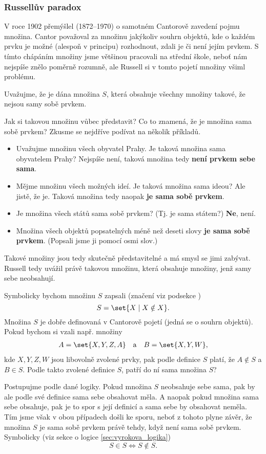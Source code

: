 \subsubsection{Russellův paradox}
V roce 1902 přemýšlel  (1872--1970) o samotném Cantorově zavedení pojmu množina. Cantor považoval za množinu jakýkoliv souhrn objektů, kde o každém prvku je možné (alespoň v principu) rozhodnout, zdali je či není jejím prvkem. S tímto chápáním množiny jsme většinou pracovali na střední škole, neboť nám nejspíše znělo poměrně rozumně, ale Russell si v tomto pojetí množiny všiml problému.\par
Uvažujme, že je dána množina $S$, která obsahuje všechny množiny takové, že nejsou samy sobě prvkem.\par
Jak si takovou množinu vůbec představit? Co to znamená, že je množina sama sobě prvkem? Zkusme se nejdříve podívat na několik příkladů.
\begin{itemize}
    \item Uvažujme množinu všech obyvatel Prahy. Je taková množina sama obyvatelem Prahy? Nejspíše není, taková množina tedy \textbf{není prvkem sebe sama}.
    \item Mějme množinu všech možných ideí. Je taková množina sama ideou? Ale jistě, že je. Taková množina tedy naopak \textbf{je sama sobě prvkem}.
    \item Je množina všech států sama sobě prvkem? (Tj. je sama státem?) \textbf{Ne}, není.
    \item Množina všech objektů popsatelných méně než deseti slovy \textbf{je sama sobě prvkem}. (Popsali jsme ji pomocí osmi slov.)
\end{itemize}
Takové množiny jsou tedy skutečně představitelné a má smysl se jimi zabývat. Russell tedy uvážil právě takovou množinu, která obsahuje množiny, jenž samy sebe neobsahují.

Symbolicky bychom množinu $S$ zapsali (značení viz podsekce )
\begin{equation*}
S=\set{X \mid X \notin X}.
\end{equation*}
Množina $S$ je dobře definovaná v Cantorově pojetí (jedná se o souhrn objektů). Pokud bychom si vzali např. množiny
\begin{align*}
A=\set{X,Y,Z,A} \quad \text{a} \quad B=\set{X,Y,W},
\end{align*}
kde $X,Y,Z,W$ jsou libovolně zvolené prvky, pak podle definice $S$ platí, že $A \notin S$ a $B \in S$. Podle takto zvolené definice $S$, patří do ní sama množina $S$?\par
Postupujme podle dané logiky. Pokud množina $S$ neobsahuje sebe sama, pak by ale podle své definice sama sebe obsahovat měla. A naopak pokud množina sama sebe obsahuje, pak je to spor s její definicí a sama sebe by obsahovat neměla. Tím jsme však v obou případech došli ke sporu, neboť z tohoto plyne závěr, že množina $S$ je sama sobě prvkem právě tehdy, když není sama sobě prvkem. Symbolicky (viz sekce o logice \ref{sec:vyrokova_logika})
\begin{equation*}
S \in S \iff S \notin S.
\end{equation*}

